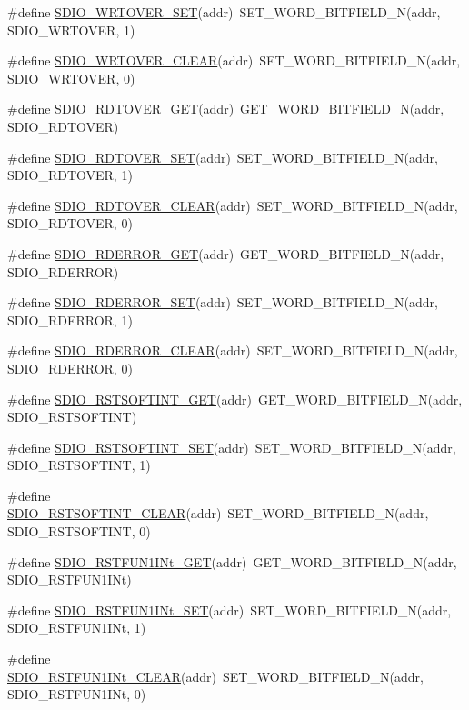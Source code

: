 \begin{DoxyCompactItemize}
\#define \hyperlink{a00570_aa6ab06ee5b6b9c6f9adaf76c95f8a805}{SDIO\_\-WRTOVER\_\-SET}(addr)~SET\_\-WORD\_\-BITFIELD\_\-N(addr, SDIO\_\-WRTOVER, 1)
\item 
\#define \hyperlink{a00570_a853a64ebc95c78cf7870fd7a6659b68a}{SDIO\_\-WRTOVER\_\-CLEAR}(addr)~SET\_\-WORD\_\-BITFIELD\_\-N(addr, SDIO\_\-WRTOVER, 0)
\item 
\#define \hyperlink{a00570_a7b1975ad6def0257234d3fc1cdc3ef42}{SDIO\_\-RDTOVER\_\-GET}(addr)~GET\_\-WORD\_\-BITFIELD\_\-N(addr, SDIO\_\-RDTOVER)
\item 
\#define \hyperlink{a00570_a0716bd507f59f0390acd2401f363386f}{SDIO\_\-RDTOVER\_\-SET}(addr)~SET\_\-WORD\_\-BITFIELD\_\-N(addr, SDIO\_\-RDTOVER, 1)
\item 
\#define \hyperlink{a00570_ac985664f3eb0711a351d2a1a2788f115}{SDIO\_\-RDTOVER\_\-CLEAR}(addr)~SET\_\-WORD\_\-BITFIELD\_\-N(addr, SDIO\_\-RDTOVER, 0)
\item 
\#define \hyperlink{a00570_ac99a1c45f8740dfb1d11d0152ac9862d}{SDIO\_\-RDERROR\_\-GET}(addr)~GET\_\-WORD\_\-BITFIELD\_\-N(addr, SDIO\_\-RDERROR)
\item 
\#define \hyperlink{a00570_adffbf7b56d5c6f16581de468f48eec4d}{SDIO\_\-RDERROR\_\-SET}(addr)~SET\_\-WORD\_\-BITFIELD\_\-N(addr, SDIO\_\-RDERROR, 1)
\item 
\#define \hyperlink{a00570_ada192b1e46458d2ced6e79ed03943077}{SDIO\_\-RDERROR\_\-CLEAR}(addr)~SET\_\-WORD\_\-BITFIELD\_\-N(addr, SDIO\_\-RDERROR, 0)
\item 
\#define \hyperlink{a00570_a2267b35d8a8d6ec107e805bb2078ad00}{SDIO\_\-RSTSOFTINT\_\-GET}(addr)~GET\_\-WORD\_\-BITFIELD\_\-N(addr, SDIO\_\-RSTSOFTINT)
\item 
\#define \hyperlink{a00570_ab8e19c829ec6fe7b6f43466c97b2205e}{SDIO\_\-RSTSOFTINT\_\-SET}(addr)~SET\_\-WORD\_\-BITFIELD\_\-N(addr, SDIO\_\-RSTSOFTINT, 1)
\item 
\#define \hyperlink{a00570_a2a33f404f8d7e62bc44baba30aa481bc}{SDIO\_\-RSTSOFTINT\_\-CLEAR}(addr)~SET\_\-WORD\_\-BITFIELD\_\-N(addr, SDIO\_\-RSTSOFTINT, 0)
\item 
\#define \hyperlink{a00570_a22588cc0a45ea32a57de15b92f891253}{SDIO\_\-RSTFUN1INt\_\-GET}(addr)~GET\_\-WORD\_\-BITFIELD\_\-N(addr, SDIO\_\-RSTFUN1INt)
\item 
\#define \hyperlink{a00570_a2b953d731a4d97ab74500f65b496ccc9}{SDIO\_\-RSTFUN1INt\_\-SET}(addr)~SET\_\-WORD\_\-BITFIELD\_\-N(addr, SDIO\_\-RSTFUN1INt, 1)
\item 
\#define \hyperlink{a00570_a4fe41b8a6f1e7dada20edb2e4b89503c}{SDIO\_\-RSTFUN1INt\_\-CLEAR}(addr)~SET\_\-WORD\_\-BITFIELD\_\-N(addr, SDIO\_\-RSTFUN1INt, 0)

\end{DoxyCompactItemize}
